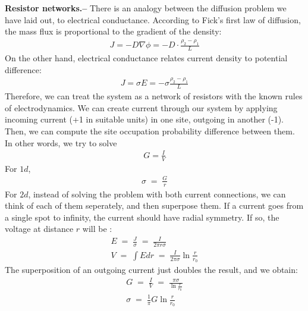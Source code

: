 \documentclass[onecolumn,fleqn,notitlepage,secnumarabic]{revtex4}
\begin{document}
{\bf Resistor networks.--}
There is an analogy between the diffusion problem we have laid out, to electrical conductance. According to Fick's first law of diffusion, the mass flux is proportional to the gradient of the density:
\begin{align}
J = -D \nabla \phi = -D\cdot \frac{\rho_2-\rho_1}{L}
\end{align}
On the other hand, electrical conductance relates current density to potential difference:
\begin{align}
J=\sigma E = -\sigma \frac{\rho_2-\rho_1}{L}
\end{align}
Therefore, we can treat the system as a network of resistors with the known rules of electrodynamics. We can create current through our system by applying incoming current (+1 in suitable units) in one site, outgoing in another (-1). Then, we can compute the site occupation probability difference between them. In other words, we try to solve 
\begin{align}
G = \frac{I}{V}
\end{align}
For $1d$, 
\begin{align}\label{eq:res_net_1d}
  \sigma \;=\; \frac{G}{r}
\end{align}
For $2d$,  instead of solving the problem with both current connections, we can think of each of them seperately, and then superpose them. If a current goes from a single spot to infinity, the current should have radial symmetry. If so, the voltage at distance $r$ will be :
\begin{align}
  E \;=\; \frac{J}{\sigma} \;=\; \frac{I}{2\pi r\sigma} \\
  V \;=\; \int E dr \;=\; \frac{I}{2\pi\sigma}\ln\frac{r}{r_0}
\end{align}
The superposition of an outgoing current just doubles the result, and we obtain:
\begin{align}
    G \;=\; \frac{I}{V} \;=\; \frac{\pi\sigma }{\ln\frac{r}{r_0}}  \\
    \sigma \;=\; \frac{1}{\pi}G\ln\frac{r}{r_0}
\end{align}

%

\end{document}

